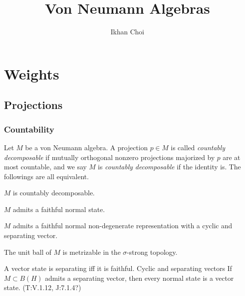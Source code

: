\documentclass{../../large}
\begin{document}
\title{Von Neumann Algebras}
\author{Ikhan Choi}
\maketitle
\tableofcontents

\iffalse
injectivity
Connes embeddability
property Gamma
Connes' bicentralizer problem
Shlyakhtenko semicircular system
group stability
bimodule
noncommutative probability
\fi


\part{Weights}


\chapter{Projections}




\section{Countability}


\begin{prb}
Let $M$ be a von Neumann algebra.
A projection $p\in M$ is called \emph{countably decomposable} if mutually orthogonal nonzero projections majorized by $p$ are at most countable, and we say $M$ is \emph{countably decomposable} if the identity is.
The followings are all equivalent.
\begin{parts}
\item $M$ is countably decomposable.
\item $M$ admits a faithful normal state.
\item $M$ admits a faithful normal non-degenerate representation with a cyclic and separating vector.
\item The unit ball of $M$ is metrizable in the $\sigma$-strong topology.
\end{parts}
\end{prb}
\begin{pf}
\end{pf}

\begin{prb}
A vector state is separating iff it is faithful.
Cyclic and separating vectors
If $M\subset B(H)$ admits a separating vector, then every normal state is a vector state. (T:V.1.12, J:7.1.4?)
\end{prb}
\end{document}
